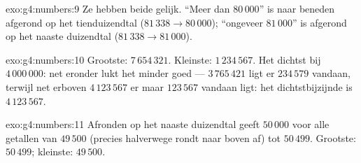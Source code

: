 \begin{solution}{exo:g4:numbers:9}
Ze hebben beide gelijk. ``Meer dan $80\,000$'' is naar beneden afgerond op
het tienduizendtal ($81\,338 \to 80\,000$); ``ongeveer $81\,000$'' is
afgerond op het naaste duizendtal ($81\,338 \to 81\,000$).
\end{solution}

\begin{solution}{exo:g4:numbers:10}
Grootste: $7\,654\,321$. Kleinste: $1\,234\,567$. Het dichtst bij
$4\,000\,000$: net eronder lukt het minder goed --- $3\,765\,421$ ligt er
$234\,579$ vandaan, terwijl net erboven $4\,123\,567$ er maar $123\,567$
vandaan ligt: het dichtstbijzijnde is $4\,123\,567$.
\end{solution}

\begin{solution}{exo:g4:numbers:11}
Afronden op het naaste duizendtal geeft $50\,000$ voor alle getallen van
$49\,500$ (precies halverwege rondt naar boven af) tot $50\,499$.
Grootste: $50\,499$; kleinste: $49\,500$.
\end{solution}

